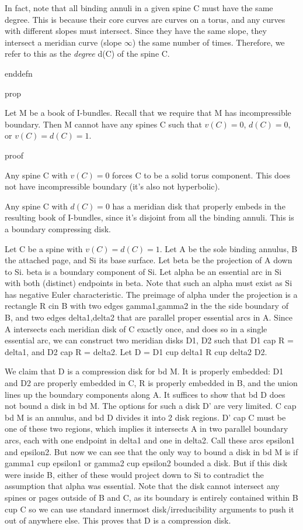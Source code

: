In fact, note that all binding annuli in a given spine C must have the same
degree. This is because their core curves are curves on a torus, and any curves
with different slopes must intersect. Since they have the same slope, they
intersect a meridian curve (slope $\infty$) the same number of times.
Therefore, we refer to this as the \emph{degree} d(C) of the spine C.

enddefn

prop

Let M be a book of I-bundles. Recall that we require that M has incompressible
boundary. Then M cannot have any spines C such that $v(C)=0$, $d(C)=0$, or
$v(C)=d(C)=1$.

proof

Any spine C with $v(C)=0$ forces C to be a solid torus component. This does not
have incompressible boundary (it's also not hyperbolic).

Any spine C with $d(C)=0$ has a meridian disk that properly embeds in the
resulting book of I-bundles, since it's disjoint from all the binding annuli.
This is a boundary compressing disk.


Let C be a spine with $v(C)=d(C)=1$. Let A be the sole binding annulus, B the
attached page, and Si its base surface. Let beta be the projection of A down to
Si. beta is a boundary component of Si. Let alpha be an essential arc in Si
with both (distinct) endpoints in beta. Note that such an alpha must exist as
Si has negative Euler characteristic. The preimage of alpha under the
projection is a rectangle R cin B with two edges gamma1,gamma2 in the the side
boundary of B, and two edges delta1,delta2 that are parallel proper essential
arcs in A.  Since A intersects each meridian disk of C exactly once, and does
so in a single essential arc, we can construct two meridian disks D1, D2 such
that D1 cap R = delta1, and D2 cap R = delta2. Let D = D1 cup delta1 R cup
delta2 D2.

We claim that D is a compression disk for bd M. It is properly embedded: D1 and
D2 are properly embedded in C, R is properly embedded in B, and the union lines
up the boundary components along A. It suffices to show that bd D does not
bound a disk in bd M. The options for such a disk D' are very limited. C cap bd
M is an annulus, and bd D divides it into 2 disk regions. D' cap C must be one
of these two regions, which implies it intersects A in two parallel boundary
arcs, each with one endpoint in delta1 and one in delta2. Call these arcs
epsilon1 and epsilon2. But now we can see that the only way to bound a disk in
bd M is if gamma1 cup epsilon1 or gamma2 cup epsilon2 bounded a disk. But if
this disk were inside B, either of these would project down to Si to contradict
the assumption that alpha was essential. Note that the disk cannot intersect
any spines or pages outside of B and C, as its boundary is entirely contained
within B cup C so we can use standard innermost disk/irreducibility arguments
to push it out of anywhere else. This proves that D is a compression disk.

